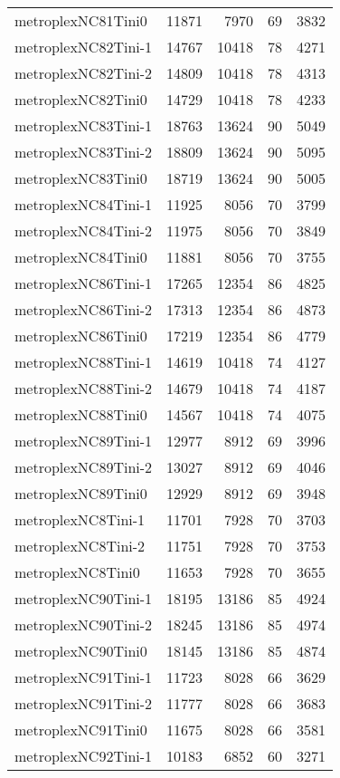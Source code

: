 \begin{longtable}{lrrrr}
metroplexNC81Tini0 & 11871 & 7970 & 69 & 3832 \\
metroplexNC82Tini-1 & 14767 & 10418 & 78 & 4271 \\
metroplexNC82Tini-2 & 14809 & 10418 & 78 & 4313 \\
metroplexNC82Tini0 & 14729 & 10418 & 78 & 4233 \\
metroplexNC83Tini-1 & 18763 & 13624 & 90 & 5049 \\
metroplexNC83Tini-2 & 18809 & 13624 & 90 & 5095 \\
metroplexNC83Tini0 & 18719 & 13624 & 90 & 5005 \\
metroplexNC84Tini-1 & 11925 & 8056 & 70 & 3799 \\
metroplexNC84Tini-2 & 11975 & 8056 & 70 & 3849 \\
metroplexNC84Tini0 & 11881 & 8056 & 70 & 3755 \\
metroplexNC86Tini-1 & 17265 & 12354 & 86 & 4825 \\
metroplexNC86Tini-2 & 17313 & 12354 & 86 & 4873 \\
metroplexNC86Tini0 & 17219 & 12354 & 86 & 4779 \\
metroplexNC88Tini-1 & 14619 & 10418 & 74 & 4127 \\
metroplexNC88Tini-2 & 14679 & 10418 & 74 & 4187 \\
metroplexNC88Tini0 & 14567 & 10418 & 74 & 4075 \\
metroplexNC89Tini-1 & 12977 & 8912 & 69 & 3996 \\
metroplexNC89Tini-2 & 13027 & 8912 & 69 & 4046 \\
metroplexNC89Tini0 & 12929 & 8912 & 69 & 3948 \\
metroplexNC8Tini-1 & 11701 & 7928 & 70 & 3703 \\
metroplexNC8Tini-2 & 11751 & 7928 & 70 & 3753 \\
metroplexNC8Tini0 & 11653 & 7928 & 70 & 3655 \\
metroplexNC90Tini-1 & 18195 & 13186 & 85 & 4924 \\
metroplexNC90Tini-2 & 18245 & 13186 & 85 & 4974 \\
metroplexNC90Tini0 & 18145 & 13186 & 85 & 4874 \\
metroplexNC91Tini-1 & 11723 & 8028 & 66 & 3629 \\
metroplexNC91Tini-2 & 11777 & 8028 & 66 & 3683 \\
metroplexNC91Tini0 & 11675 & 8028 & 66 & 3581 \\
metroplexNC92Tini-1 & 10183 & 6852 & 60 & 3271 \\

\end{longtable}
